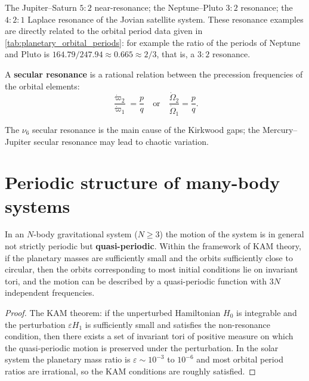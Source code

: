 \begin{example}
The Jupiter--Saturn \(5:2\) near-resonance; the Neptune--Pluto \(3:2\) resonance; the \(4:2:1\) Laplace resonance of the Jovian satellite system. These resonance examples are directly related to the orbital period data given in \cref{tab:planetary_orbital_periods}: for example the ratio of the periods of Neptune and Pluto is $164.79/247.94\approx 0.665\approx 2/3$, that is, a $3:2$ resonance.
\end{example}

\begin{definition}\label{def:secular_resonance}
A \textbf{secular resonance} is a rational relation between the precession frequencies of the orbital elements:
\[
\frac{\dot\varpi_2}{\dot\varpi_1}=\frac pq
\quad\text{or}\quad
\frac{\dot\Omega_2}{\dot\Omega_1}=\frac pq.
\]
\end{definition}

\begin{example}
The \(\nu_6\) secular resonance is the main cause of the Kirkwood gaps; the Mercury--Jupiter secular resonance may lead to chaotic variation.
\end{example}

\section{Periodic structure of many-body systems}

\begin{theorem}\label{thm:n_body_quasiperiodic}
In an \(N\)-body gravitational system (\(N\ge3\)) the motion of the system is in general not strictly periodic but \textbf{quasi-periodic}. Within the framework of KAM theory, if the planetary masses are sufficiently small and the orbits sufficiently close to circular, then the orbits corresponding to most initial conditions lie on invariant tori, and the motion can be described by a quasi-periodic function with \(3N\) independent frequencies.
\end{theorem}

\begin{proof}
The KAM theorem: if the unperturbed Hamiltonian \(H_0\) is integrable and the perturbation \(\varepsilon H_1\) is sufficiently small and satisfies the non-resonance condition, then there exists a set of invariant tori of positive measure on which the quasi-periodic motion is preserved under the perturbation. In the solar system the planetary mass ratio is \(\varepsilon\sim10^{-3}\) to \(10^{-6}\) and most orbital period ratios are irrational, so the KAM conditions are roughly satisfied.
\end{proof}

